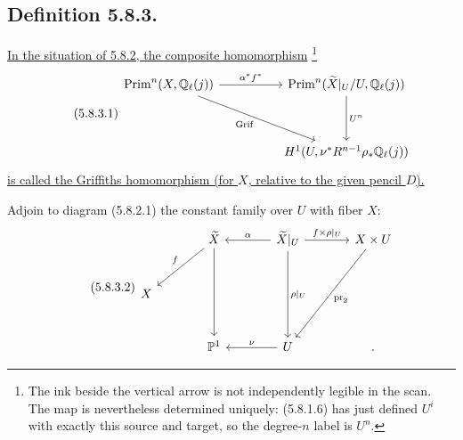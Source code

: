 \subsection*{Definition 5.8.3.}
\underline{In the situation of 5.8.2, the composite homomorphism}
\footnote{The ink beside the vertical arrow is not independently legible in
the scan.  The map is nevertheless determined uniquely: (5.8.1.6) has just
defined $U^i$ with exactly this source and target, so the degree-$n$ label is
$U^n$.}
\begin{equation}\tag{5.8.3.1}
\begin{tikzcd}[column sep=huge,row sep=huge]
\operatorname{Prim}^n(X,\mathbb Q_\ell(j))
  \arrow[r,"\alpha^*f^*"]
  \arrow[dr,"\operatorname{Grif}"']
&
\operatorname{Prim}^n(\widetilde X|_U/U,\mathbb Q_\ell(j))
  \arrow[d,"U^n"]
\\
{}
&
H^1(U,\nu^*R^{n-1}\rho_*\mathbb Q_\ell(j))
\end{tikzcd}
\end{equation}
\underline{is called the Griffiths homomorphism (for $X$, relative to the
given pencil $D$).}

Adjoin to diagram (5.8.2.1) the constant family over $U$ with fiber $X$:
\begin{equation}\tag{5.8.3.2}
\begin{tikzcd}[row sep=large,column sep=large]
{}
&
\widetilde X
  \arrow[dl,"f"']
  \arrow[dd]
&
\widetilde X|_U
  \arrow[l,"\alpha"']
  \arrow[r,"f\times\rho|_U"]
  \arrow[dd,"\rho|_U"]
&
X\times U
  \arrow[ddl,"\operatorname{pr}_2"]
\\
X&{}&{}&{}
\\
{}
&
\mathbb P^1
&
U\arrow[l,"\nu"']
&
.
\end{tikzcd}
\end{equation}

